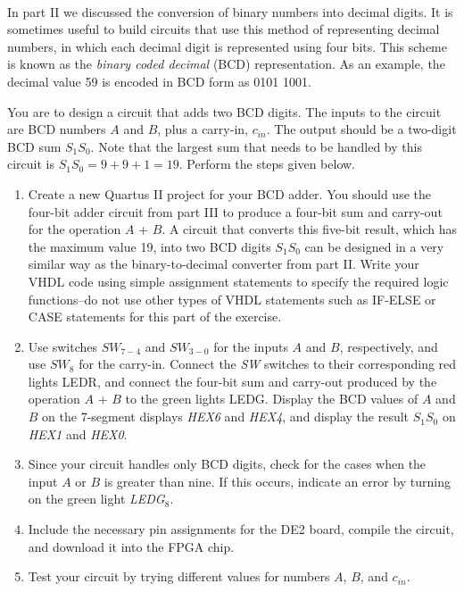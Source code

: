 \documentclass[psfig,10pt,fullpage]{article}
\begin{document}
~\\
In part II we discussed the conversion of binary numbers into decimal digits. It is
sometimes useful to build circuits that use this method of representing decimal numbers,
in which each decimal digit is represented using four bits. This scheme is known as the
{\it binary coded decimal} (BCD) representation. As an example, the decimal value 59 is
encoded in BCD form as 0101 1001.

You are to design a circuit that adds two BCD digits. The inputs to the circuit
are BCD numbers $A$ and $B$, plus a carry-in, $c_{in}$. The output should be a two-digit
BCD sum $S_1 S_0$. Note that the largest sum that needs to be handled by this circuit
is $S_1 S_0 = 9 + 9 + 1 = 19$. Perform the steps given below.

\begin{enumerate}
\item Create a new Quartus II project for your BCD adder. You should use the
four-bit adder circuit from part III to produce a four-bit sum and carry-out for the
operation $A$ + $B$. A circuit that converts this five-bit result, which has the maximum
value 19, into two BCD digits $S_1 S_0$ can be designed in a very
similar way as the binary-to-decimal converter from part II. Write your VHDL code using
simple assignment statements to specify the required logic functions--do not use 
other types of VHDL
statements such as IF-ELSE or CASE statements for this part of the exercise.
\item Use switches $SW_{7-4}$ and $SW_{3-0}$ for the inputs $A$ and $B$, respectively, and
use $SW_{8}$ for the carry-in. Connect the {\it SW} switches to
their corresponding red lights LEDR, and connect the four-bit sum and carry-out produced 
by the operation $A$ + $B$ to the green lights LEDG. Display the BCD values of $A$
and $B$ on the 7-segment displays {\it HEX6} and {\it HEX4}, and display the result $S_1 S_0$ on
{\it HEX1} and {\it HEX0}.
\item Since your circuit handles only BCD digits, check for the cases when the input 
$A$ or $B$ is greater than nine. If this occurs, indicate an error by turning on 
the green light {\it LEDG}$_8$.
\item Include the necessary pin assignments for the DE2 board, compile the circuit, and
download it into the FPGA chip.
\item Test your circuit by trying different values for numbers $A$, $B$, and $c_{in}$.
\end{enumerate}
\end{document}
